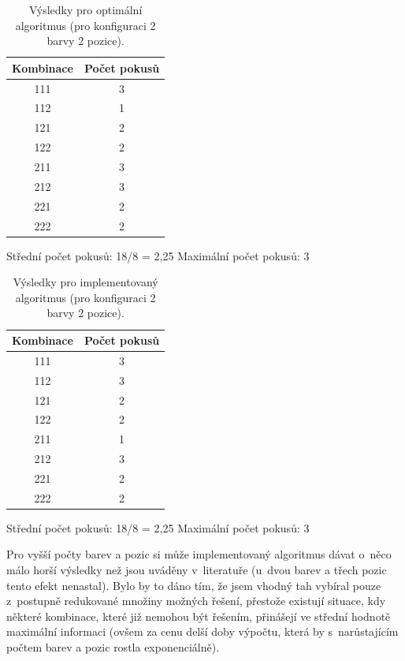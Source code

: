 \documentclass[12pt, a4paper]{article}
\begin{document}
\begin{table}[h]
\centering
\begin{tabular}{c | c }

Kombinace &   Počet pokusů\\
\hline
111  & 3\\
112  & 1\\
121  & 2\\
122  & 2\\
211  & 3\\
212  & 3\\
221  & 2\\
222  & 2\\

\end{tabular}

Střední počet pokusů:  18/8 = 2,25
Maximální počet pokusů:  3 

\label{tab:optimal}
\caption{Výsledky pro optimální algoritmus (pro konfiguraci 2 barvy 2 pozice).}
\end{table}



\begin{table}[ht]
\centering
\begin{tabular}{c | c }

Kombinace &   Počet pokusů\\
\hline
111  & 3\\
112  & 3\\
121  & 2\\
122  & 2\\
211  & 1\\
212  & 3\\
221  & 2\\
222  & 2\\

\end{tabular}

Střední počet pokusů:  18/8 = 2,25
Maximální počet pokusů:  3 
\label{tab:implementace}
\caption{Výsledky pro implementovaný algoritmus (pro konfiguraci 2 barvy 2 pozice).}
\end{table}

Pro vyšší počty barev a pozic si může implementovaný algoritmus dávat o~něco málo horší výsledky než jsou uváděny v~literatuře (u~dvou barev a třech pozic tento efekt nenastal). Bylo by to dáno tím, že jsem vhodný tah vybíral pouze z~postupně redukované množiny možných řešení, přestože existují situace, kdy některé kombinace, které již nemohou být řešením, přinášejí ve střední hodnotě maximální informaci (ovšem za cenu delší doby výpočtu, která by s~narůstajícím počtem barev a pozic rostla exponenciálně). 
\end{document}
